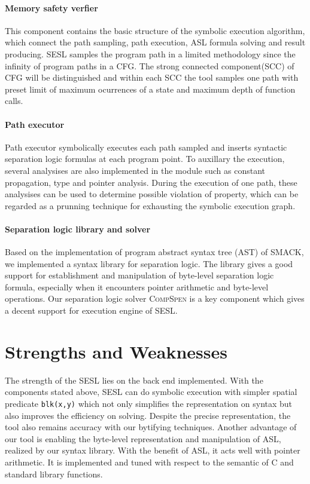\documentclass[runningheads]{llncs}
\newcommand{\lx}[1]{\color{teal}{LX: #1 :XL} \color{black}}
\begin{document}
\paragraph{Memory safety verfier} This component contains the basic structure of the symbolic execution algorithm, which connect the path sampling, path execution, ASL formula solving and result producing. \textsc{SESL} samples the program path in a limited methodology since the infinity of program paths in a CFG. The strong connected component(SCC) of CFG will be distinguished and within each SCC the tool samples one path with preset limit of maximum ocurrences of a state and  maximum depth of function calls.

\paragraph{Path executor} Path executor symbolically executes each path sampled and inserts  syntactic separation logic formulas at each program point. To auxillary the execution, several analysises are also implemented in the module such as constant propagation,  type and pointer analysis. During the execution of one path, these analysises can be used to determine possible violation of property, which can be regarded as a prunning technique for exhausting the symbolic execution graph.

\paragraph{Separation logic library and solver} Based on the implementation of program abstract syntax tree (AST) of \textsc{SMACK}, we implemented a syntax library for separation logic. The library gives a good support for establishment and manipulation of byte-level separation logic formula, especially when it encounters pointer arithmetic and byte-level operations. 
Our separation logic solver \textsc{CompSpen} is a key component which gives a decent support for execution engine of \textsc{SESL}. 


\section{Strengths and Weaknesses}

The strength of the \textsc{SESL} lies on the back end implemented. With the components stated above, \textsc{SESL} can do symbolic execution with simpler spatial predicate \texttt{blk(x,y)} which not only simplifies the representation on syntax but also improves the efficiency on solving. Despite the precise representation, the tool also  remains accuracy with our bytifying techniques. Another advantage of our tool is enabling the byte-level representation and manipulation of ASL, realized by our syntax library. With the benefit of ASL, it acts well with pointer arithmetic. It is implemented and tuned with respect to the semantic of C and standard library functions.\lx{Add description of the competition results in the paragraph.}
\end{document}
